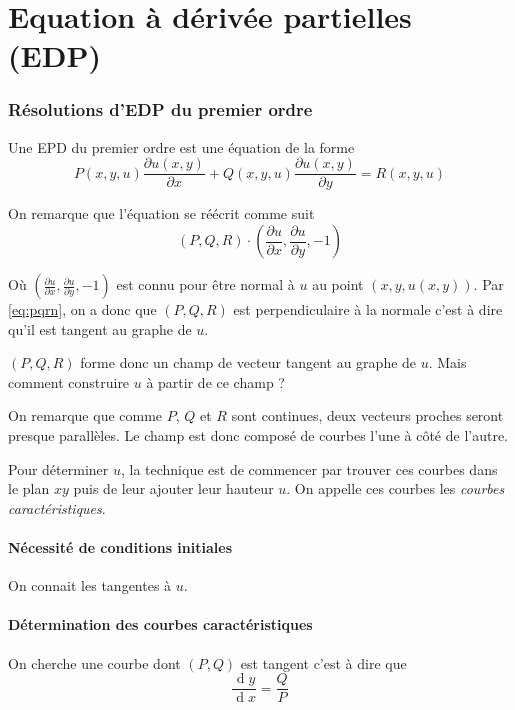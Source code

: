 

\usepackage{amsmath}
\usepackage{amsfonts}
\usepackage{amssymb}

\DeclareMathOperator{\newdiff}{d} %
\newcommand{\dif}{\newdiff\!}

\newcommand{\fpart}[2]{\frac{\partial #1}{\partial #2}}
\newcommand{\fdif}[2]{\frac{\dif #1}{\dif #2}}
\newcommand\constant{\ensuremath{\mathrm{cst}}}


\part{Equation à dérivée partielles (EDP)}
\section{Résolutions d'EDP du premier ordre}
Une EPD du premier ordre est une équation de la forme
\[ P(x, y, u)\fpart{u(x, y)}{x} %
  + Q(x, y, u)\fpart{u(x, y)}{y}
  = R(x, y, u) \]

On remarque que l'équation se réécrit comme suit
\begin{equation}
  \left(P, Q, R\right) \cdot \left(
  \fpart{u}{x}, \fpart{u}{y}, -1\right) \label{eq:pqrn}
\end{equation}

Où $\left(\fpart{u}{x}, \fpart{u}{y}, -1\right)$ est connu pour être normal
à $u$ au point $\left(x, y, u(x, y)\right)$.
Par \eqref{eq:pqrn}, on a donc que $(P, Q, R)$ est perpendiculaire à la normale
c'est à dire qu'il est tangent au graphe de $u$.

$(P, Q, R)$ forme donc un champ de vecteur tangent au graphe de $u$.
Mais comment construire $u$ à partir de ce champ ?

On remarque que comme $P$, $Q$ et $R$ sont continues, deux vecteurs proches
seront presque parallèles. Le champ est donc composé de courbes l'une à côté
de l'autre.

Pour déterminer $u$, la technique est de commencer par trouver ces courbes
dans le plan $xy$ puis de leur ajouter leur hauteur $u$.
On appelle ces courbes les \emph{courbes caractéristiques}.

\subsection{Nécessité de conditions initiales}
On connait les tangentes à $u$.

\subsection{Détermination des courbes caractéristiques}
On cherche une courbe dont $(P, Q)$ est tangent c'est à dire que
\[ \fdif{y}{x} = \frac{Q}{P} \]


